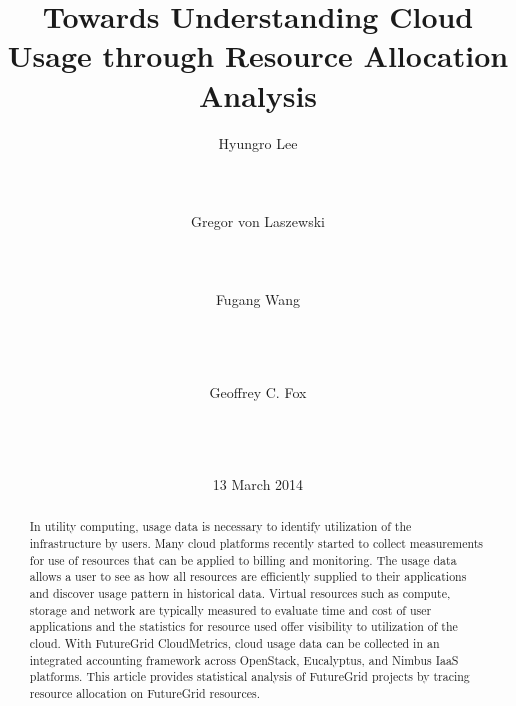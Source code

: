 \documentclass{sig-alternate}
\newcommand{\TITLE}{Towards Understanding Cloud Usage through Resource Allocation Analysis}
\begin{document}
 
% 
 
\title{\TITLE} 
 
\author{ 
\alignauthor 
Hyungro Lee\\ 
       \\ 
       \\ 
       \\ 
\alignauthor 
Gregor von Laszewski\\ 
       \\ 
       \\ 
       \\ 
\alignauthor 
Fugang Wang\\ 
       \\ 
       \\ 
       \\ 
\and
\alignauthor 
Geoffrey C. Fox\\ 
       \\ 
       \\ 
       \\ 
\and  %
} 
\date{13 March 2014} 
 
\toappear{} 
\maketitle 
\begin{abstract} 

In utility computing, usage data is necessary to identify utilization of the infrastructure by users. Many cloud platforms recently started to collect measurements for use of resources that can be applied to billing and monitoring. The usage data allows a user to see as how all resources are efficiently supplied to their applications and discover usage pattern in historical data. Virtual resources such as compute, storage and network are typically measured to evaluate time and cost of user applications and the statistics for resource used offer visibility to utilization of the cloud. With FutureGrid CloudMetrics, cloud usage data can be collected in an integrated accounting framework across OpenStack, Eucalyptus, and Nimbus IaaS platforms. This article provides statistical analysis of FutureGrid projects by tracing resource allocation on FutureGrid resources.

\end{abstract} 
 
\end{document}
